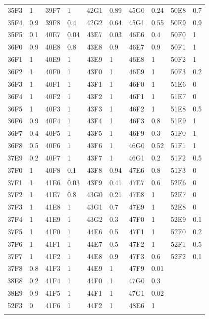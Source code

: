 \documentclass[a4paper 12pt]{article}
\numberwithin{equation}{section}
\begin{document}
\begin{small}
\begin{table}[h!]
\begin{footnotesize}
\begin{tabular}{clclclclcl}
 35F3 &    1 & 39F7 &    1 & 42G1 & 0.89 & 45G0 & 0.24 & 50E8 &  0.7 \\ 
 35F4 &  0.9 & 39F8 &  0.4 & 42G2 & 0.64 & 45G1 & 0.55 & 50E9 &  0.9 \\ 
 35F5 &  0.1 & 40E7 & 0.04 & 43E7 & 0.03 & 46E6 &  0.4 & 50F0 &    1 \\ 
 36F0 &  0.9 & 40E8 &  0.8 & 43E8 &  0.9 & 46E7 &  0.9 & 50F1 &    1 \\ 
 36F1 &    1 & 40E9 &    1 & 43E9 &    1 & 46E8 &    1 & 50F2 &    1 \\ 
 36F2 &    1 & 40F0 &    1 & 43F0 &    1 & 46E9 &    1 & 50F3 &  0.2 \\ 
 36F3 &    1 & 40F1 &    1 & 43F1 &    1 & 46F0 &    1 & 51E6 &    0 \\ 
 36F4 &    1 & 40F2 &    1 & 43F2 &    1 & 46F1 &    1 & 51E7 &    0 \\ 
 36F5 &    1 & 40F3 &    1 & 43F3 &    1 & 46F2 &    1 & 51E8 &  0.5 \\ 
 36F6 &  0.9 & 40F4 &    1 & 43F4 &    1 & 46F3 &  0.8 & 51E9 &    1 \\ 
 36F7 &  0.4 & 40F5 &    1 & 43F5 &    1 & 46F9 &  0.3 & 51F0 &    1 \\ 
 36F8 &  0.5 & 40F6 &    1 & 43F6 &    1 & 46G0 & 0.52 & 51F1 &    1 \\ 
 37E9 &  0.2 & 40F7 &    1 & 43F7 &    1 & 46G1 &  0.2 & 51F2 &  0.5 \\ 
 37F0 &    1 & 40F8 &  0.1 & 43F8 & 0.94 & 47E6 &  0.8 & 51F3 &    0 \\ 
 37F1 &    1 & 41E6 & 0.03 & 43F9 & 0.41 & 47E7 &  0.6 & 52E6 &    0 \\ 
 37F2 &    1 & 41E7 &  0.8 & 43G0 & 0.21 & 47E8 &    1 & 52E7 &    0 \\ 
 37F3 &    1 & 41E8 &    1 & 43G1 &  0.7 & 47E9 &    1 & 52E8 &    0 \\ 
 37F4 &    1 & 41E9 &    1 & 43G2 &  0.3 & 47F0 &    1 & 52E9 &  0.1 \\ 
 37F5 &    1 & 41F0 &    1 & 44E6 &  0.5 & 47F1 &    1 & 52F0 &  0.2 \\ 
 37F6 &    1 & 41F1 &    1 & 44E7 &  0.5 & 47F2 &    1 & 52F1 &  0.5 \\ 
 37F7 &    1 & 41F2 &    1 & 44E8 &  0.9 & 47F3 &  0.6 & 52F2 &  0.1 \\ 
 37F8 &  0.8 & 41F3 &    1 & 44E9 &    1 & 47F9 & 0.01 &  &  \\ 
 38E8 &  0.2 & 41F4 &    1 & 44F0 &    1 & 47G0 &  0.3 &  &  \\ 
 38E9 &  0.9 & 41F5 &    1 & 44F1 &    1 & 47G1 & 0.02 &  &  \\ 
 52F3 &    0 & 41F6 &    1 & 44F2 &    1 & 48E6 &    1 &  &  \\ 
   \hline \\[0.8ex]
\end{tabular}
\label{tab:weights}
\end{footnotesize}
\end{table}
 \end{small}
 
\end{document}
